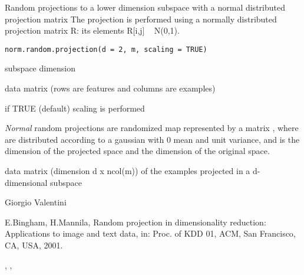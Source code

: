 \documentclass{article}
\begin{document}
\begin{Description}\relax
Random projections to a lower dimension subspace with a normal distributed projection matrix
The projection is performed using a normally distributed projection matrix R: its elements R[i,j] ~ N(0,1).
\end{Description}
\begin{Usage}
\begin{verbatim}
norm.random.projection(d = 2, m, scaling = TRUE)
\end{verbatim}
\end{Usage}
\begin{Arguments}
\begin{ldescription}
\item[\code{d}] subspace dimension 
\item[\code{m}] data matrix (rows are features and columns are examples) 
\item[\code{scaling}] if TRUE (default) scaling is performed 
\end{ldescription}
\end{Arguments}
\begin{Details}\relax
\emph{Normal} random projections are randomized map  represented by a  matrix
, where  are  distributed according to a gaussian  with 0 mean 
and unit variance, and   is the
dimension of the projected space and  the dimension of the original space.
\end{Details}
\begin{Value}
data matrix (dimension d x ncol(m)) of the examples projected in a d-dimensional  subspace
\end{Value}
\begin{Author}\relax
Giorgio Valentini 
\end{Author}
\begin{References}\relax
E.Bingham, H.Mannila, Random projection in dimensionality reduction:
Applications to image and text data, in: Proc. of KDD 01, ACM, San Francisco,
CA, USA, 2001.
\end{References}
\begin{SeeAlso}\relax
{}, ,
\end{SeeAlso}
\end{document}
